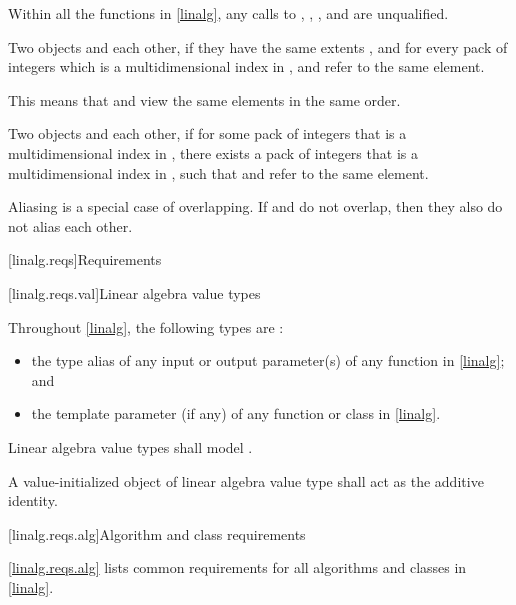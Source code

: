 \pnum
Within all the functions in \ref{linalg},
any calls to , , , and 
are unqualified.

\pnum
Two  objects  and   each other,
if they have the same extents , and
for every pack of integers 
which is a multidimensional index in ,
 and  refer to the same element.
\begin{note}
This means that
 and  view the same elements in the same order.
\end{note}

\pnum
Two  objects  and   each other,
if for some pack of integers 
that is a multidimensional index in ,
there exists a pack of integers 
that is a multidimensional index in ,
such that  and  refer to the same element.
\begin{note}
Aliasing is a special case of overlapping.
If  and  do not overlap,
then they also do not alias each other.
\end{note}

[linalg.reqs]{Requirements}

[linalg.reqs.val]{Linear algebra value types}

\pnum
Throughout \ref{linalg},
the following types are
:
\begin{itemize}
\item
the  type alias of
any input or output  parameter(s) of
any function in \ref{linalg}; and
\item
the  template parameter (if any) of
any function or class in \ref{linalg}.
\end{itemize}

\pnum
Linear algebra value types shall model .

\pnum
A value-initialized object of linear algebra value type
shall act as the additive identity.

[linalg.reqs.alg]{Algorithm and class requirements}

\pnum
\ref{linalg.reqs.alg} lists common requirements for
all algorithms and classes in \ref{linalg}.

